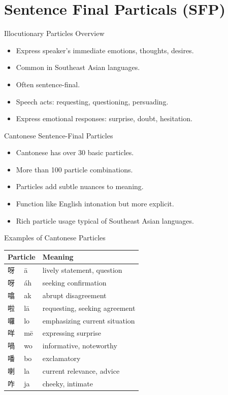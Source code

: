 \documentclass{beamer}
\begin{document}
\section{Sentence Final Particals (SFP)}

\begin{frame}{Illocutionary Particles Overview}
  \begin{itemize}
    \item Express speaker's immediate emotions, thoughts, desires.
    \item Common in Southeast Asian languages.
    \item Often sentence-final.
    \item Speech acts: requesting, questioning, persuading.
    \item Express emotional responses: surprise, doubt, hesitation.
  \end{itemize}
\end{frame}

\begin{frame}{Cantonese Sentence-Final Particles}
  \begin{itemize}
    \item Cantonese has over 30 basic particles.
    \item More than 100 particle combinations.
    \item Particles add subtle nuances to meaning.
    \item Function like English intonation but more explicit.
    \item Rich particle usage typical of Southeast Asian languages.
  \end{itemize}
 \end{frame}

\begin{frame}{Examples of Cantonese Particles}
  \begin{table}[h]
    \centering
\begin{tabular}{lll}
  \hline
   \multicolumn{2}{c}{Particle} & \textbf{Meaning} \\
  \hline
  呀 & ā & lively statement, question \\ 
  呀 & áh & seeking confirmation \\ 
  噏 & ak & abrupt disagreement \\ 
  啦 & lā & requesting, seeking agreement \\ 
  囉 & lo & emphasizing current situation \\ 
  咩 & mē & expressing surprise \\
  喎 & wo & informative, noteworthy \\ 
  噃 & bo & exclamatory \\ 
  喇 & la & current relevance, advice \\ 
  咋 & ja & cheeky, intimate \\ 
  \hline
\end{tabular}
  \end{table}
\end{frame}
\end{document}
